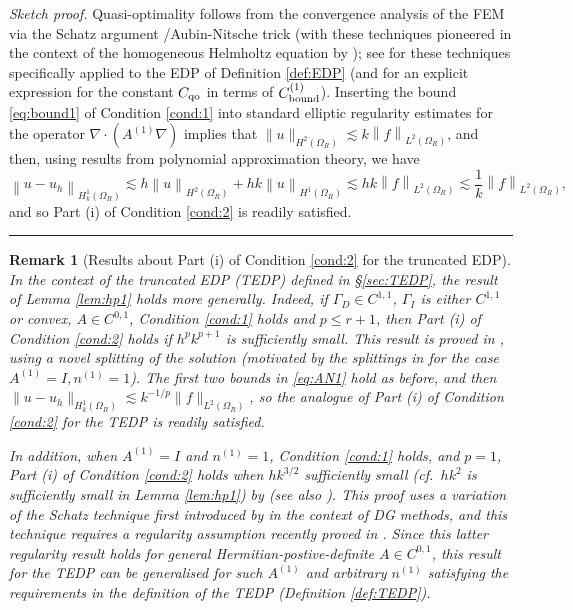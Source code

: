 \documentclass[10pt]{article}%
\newenvironment{proof}[1][Proof]{\noindent \emph{#1.} }
{\hfill \ \rule{0.5em}{0.5em}}
\newtheorem{remark}[theorem]{Remark}
\numberwithin{equation}{section}
\newcommand{\beq}{\begin{equation}}
\newcommand{\eeq}{\end{equation}}
\newcommand{\bre}{\begin{remark}}
\newcommand{\ere}{\end{remark}}
\newcommand{\bpf}{\begin{proof}}
\newcommand{\epf}{\end{proof}}
\newcommand{\OR}{{\Omega_R}}
\newcommand{\HoDkk}{{H^1_{k}(\domain_R)}}
\newcommand*{\N}[1]{\left\|#1\right\|}
\newcommand{\domain}{\Omega}
\newcommand{\coeffAo}{A^{(1)}}
\newcommand{\coeffno}{n^{(1)}}
\begin{document}
\bpf[Sketch proof]
Quasi-optimality follows from the convergence analysis of the FEM via the Schatz argument \cite{Sc:74}/Aubin-Nitsche trick (with these techniques pioneered in the context of the homogeneous Helmholtz equation by \cite{Me:95, Sa:06, MeSa:10, MeSa:11}); see \cite[\S6]{GaSpWu:18} for these techniques specifically applied to the EDP of Definition \ref{def:EDP} (and for an explicit expression for the constant $C_{\rm qo}$ in terms of $C_{\rm bound}^{(1)}$). 
Inserting the bound  \eqref{eq:bound1} of Condition \ref{cond:1} into standard elliptic regularity estimates for the operator $\nabla\cdot(\coeffAo\nabla )$ implies that $\|u\|_{H^2(\OR)}\lesssim k\N{f}_{L^2(\OR)}$, and then, using results from polynomial approximation theory, we have
 \beq\label{eq:AN1}
\N{u-u_h}_{\HoDkk} \lesssim h \N{u}_{H^2(\OR)} + hk \N{u}_{H^1(\OR)}\lesssim hk \N{f}_{L^2(\OR)} \lesssim \frac{1}{k}\N{f}_{L^2(\OR)},
\eeq
and so Part (i) of Condition \ref{cond:2} is readily satisfied.
\epf

\bre[Results about Part (i) of Condition \ref{cond:2} for the truncated EDP]
In the context of the truncated EDP (TEDP) defined in \S\ref{sec:TEDP}, the result of Lemma \ref{lem:hp1} holds more generally. Indeed,
if $\Gamma_D\in C^{1,1}$, $\Gamma_I$ is either $C^{1,1}$ or convex, $A\in C^{0,1}$, Condition \ref{cond:1} holds and $p\leq r+1$, then Part (i) of Condition \ref{cond:2} holds
if $h^p k^{p+1}$ is sufficiently small. This result is proved 
in \cite{ChNi:18a}, using a novel splitting of the solution (motivated by the splittings in \cite{MeSa:10, MeSa:11} for the case $\coeffAo= I, \coeffno=1$). The first two bounds in \eqref{eq:AN1} hold as before, and then 
$\|u-u_h\|_{\HoDkk} \lesssim  k^{-1/p}\|f\|_{L^2(\OR)}$, so the analogue of Part (i) of Condition \ref{cond:2} for the TEDP is readily satisfied.

In addition, when $\coeffAo=I$ and $\coeffno=1$, Condition \ref{cond:1} holds, and $p=1$,  Part (i) of Condition \ref{cond:2} holds when $hk^{3/2}$ sufficiently small (cf.~$hk^2$ is sufficiently small in Lemma \ref{lem:hp1}) by 
\cite{ZhWu:13} (see also \cite{ChNi:18}). This proof uses 
a variation of the Schatz technique first introduced by \cite{FeWu:11} in the context of DG methods, and this technique requires a regularity assumption recently proved in \cite{ChNiTo:18}. Since this latter regularity result holds for general Hermitian-postive-definite $A\in C^{0,1}$, this result for the TEDP can be generalised for such $\coeffAo$ and arbitrary $\coeffno$ satisfying the requirements in the definition of the TEDP (Definition \ref{def:TEDP}).
\ere
\end{document}
